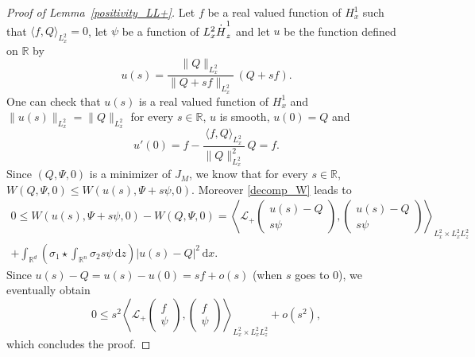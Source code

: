 \documentclass[11pt]{article}
\DeclareRobustCommand{\accentset}[2]{\overset{#1}{#2}}
\theoremstyle{definition}
\newcommand*{\overbigdot}[1]{%
\accentset{\mbox{\large\bfseries .}}{#1}}
\newenvironment{ProofOf}[1]{\begin{proof}[Proof of #1]}{\end{proof}}
\newcommand{\R}{\mathbb{R}}
\newcommand{\ud}{\, {\mathrm{d}}}
\begin{document}
\begin{ProofOf}{Lemma~\ref{positivity_LL+}}
Let $f$ be a real valued function of $H_{x}^{1}$ such that $\langle f,Q\rangle_{L_{x}^{2}}=0$, let $\psi$ be a function of $L_{x}^{2}\overbigdot{H}_{z}^{1}$ and let $u$ be the function defined on $\R$ by
\[
u(s)=\frac{\|Q\|_{L_{x}^{2}}}{\|Q+sf\|_{L_{x}^{2}}}\,(Q+sf).
\]
One can check that $u(s)$ is a real valued function of $H_{x}^{1}$ and $\|u(s)\|_{L_{x}^{2}}=\|Q\|_{L_{x}^{2}}$ for every $s\in\R$, $u$ is smooth, $u(0)=Q$ and
\[
u'(0)=f-\frac{\langle f,Q\rangle_{L_{x}^{2}}}{\|Q\|_{L_{x}^{2}}^{2}}\,Q=f.
\]
Since $(Q,\Psi,0)$ is a minimizer of $J_{M}$, we know that for every $s\in\R$, $W(Q,\Psi,0)\leq W(u(s),\Psi+s\psi,0)$. Moreover \eqref{decomp_W} leads to
\bgroup
{}
\begin{multline*}
0\leq W(u(s),\Psi+s\psi,0)-W(Q,\Psi,0)=\left\langle\mathcal{L}_{+}\begin{pmatrix} u(s)-Q\\s\psi \end{pmatrix},\begin{pmatrix} u(s)-Q\\s\psi \end{pmatrix}\right\rangle_{L_{x}^{2}\times L_{x}^{2}L_{z}^{2}}\\
+\int_{\R^{d}}\left(\sigma_{1}\star\int_{\R^{n}}\sigma_{2}s\psi\ud z\right)|u(s)-Q|^{2}\ud x.
\end{multline*}
\egroup
Since $u(s)-Q=u(s)-u(0)=sf+o(s)$ (when $s$ goes to $0$), we eventually obtain
\[
0\leq s^{2}\left\langle\mathcal{L}_{+}\begin{pmatrix} f\\\psi \end{pmatrix},\begin{pmatrix} f\\\psi \end{pmatrix}\right\rangle_{L_{x}^{2}\times L_{x}^{2}L_{z}^{2}}+o(s^{2}),
\]
which concludes the proof.
\end{ProofOf}
\end{document}
